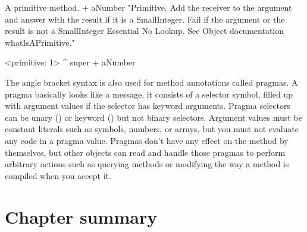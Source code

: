\documentclass[a4paper,10pt,twoside]{book}
\begin{document}
\begin{method}[primitive]{A primitive method.}
+ aNumber 
  "Primitive. Add the receiver to the argument and answer with the result
  if it is a SmallInteger. Fail if the argument or the result is not a
  SmallInteger  Essential  No Lookup. See Object documentation whatIsAPrimitive."

  <primitive: 1>
  ^ super + aNumber
\end{method}





The angle bracket syntax is also used for method annotations called pragmas.
A pragma basically looks like a message, it consists of a selector symbol, filled up with argument values if the selector has keyword arguments.
Pragma selectors can be unary () or keyword () but not binary selectors.
Argument values must be constant literals such as symbols, numbers, or arrays, but you must not evaluate any code in a pragma value.
Pragmas don't have any effect on the method by themselves, but other objects can read and handle those pragmas to perform arbitrary actions such as querying methods or modifying the way a method is compiled when you accept it.

\section{Chapter summary}
\end{document}
